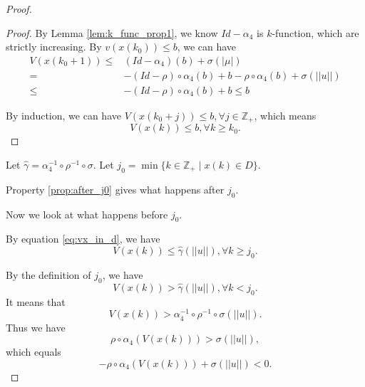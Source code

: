 \begin{proof}
\begin{myprop}
\begin{proof}
By Lemma \ref{lem:k_func_prop1}, we know $ Id - \alpha_{4} $ is $ k $-function, which are strictly increasing.
By $ v( x( k_{0} ) ) \leq b $, we can have
\begin{equation}
\begin{aligned}
V( x(k_{0} + 1) ) \leq & ( Id - \alpha_{4} ) ( b ) + \sigma ( | \mu | ) \\
= & - (Id - \rho) \circ \alpha_{4} ( b ) + b - \rho \circ \alpha_{4} ( b ) + \sigma ( || u || ) \\
\leq & - (Id - \rho) \circ \alpha_{4} ( b ) + b \leq b
\end{aligned}
\end{equation}

By induction, we can have $ V( x( k_{0} + j ) ) \leq b , \forall j \in \mathbb{Z}_{+} $, which means
\begin{equation}
\label{eq:vx_in_d}
V( x( k ) ) \leq b,  \forall k \geq k_{0}.
\end{equation}

\end{proof}
\end{myprop}

Let $ \hat{\gamma} = \alpha_{4}^{-1} \circ \rho^{-1} \circ \sigma $.
Let $ j_{0} = \min \{ k \in \mathbb{Z}_{+} \mid x( k ) \in D \} $.

Property \ref{prop:after_j0} gives what happens after $ j_{0} $.

Now we look at what happens before $ j_{0} $.

By equation \eqref{eq:vx_in_d}, we have
\begin{equation}
V( x( k ) ) \leq \hat{\gamma} ( || u || ), \forall k \geq j_{0}.
\end{equation}

By the definition of $ j_{0} $, we have 
\begin{equation}
V( x( k ) ) > \hat{\gamma} ( || u || ), \forall k < j_{0}.
\end{equation}
It means that 
\begin{equation}
V( x( k ) ) > \alpha_{4}^{-1} \circ \rho^{-1} \circ \sigma ( || u || ).
\end{equation}
Thus we have
\begin{equation}
\rho \circ \alpha_{4} ( V( x( k ) ) ) > \sigma ( || u || ),
\end{equation}
which equals
\begin{equation}
\label{eq:ineq_to_sigma_u}
- \rho \circ \alpha_{4} ( V( x( k ) ) ) + \sigma ( || u || ) < 0.
\end{equation}


\end{proof}
